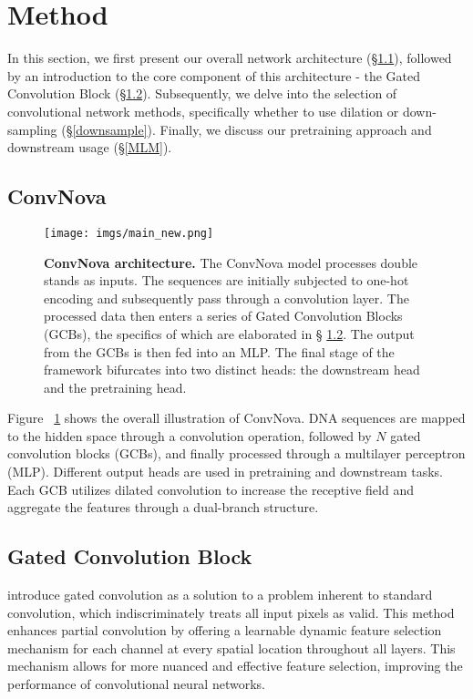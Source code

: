 \section{Method}
\label{Method}
In this section, we first present our overall network architecture (\S  \ref{dnacnn}), followed by an introduction to the core component of this architecture - the Gated Convolution Block (\S \ref{gatecnn}). Subsequently, we delve into the selection of convolutional network methods, specifically whether to use dilation or down-sampling (\S  \ref{downsample}). Finally, we discuss our pretraining approach and downstream usage (\S \ref{MLM}).

\subsection{ConvNova} \label{dnacnn}
\begin{figure}[!]
    \centering
    \texttt{[image: imgs/main\_new.png]} 
    \caption{\textbf{ConvNova architecture.} The ConvNova model processes double stands as inputs. The sequences are initially subjected to one-hot encoding and subsequently pass through a convolution layer. The processed data then enters a series of Gated Convolution Blocks (GCBs), the specifics of which are elaborated in %
    \S  
    \ref{gatecnn}. The output from the GCBs is then fed into an MLP. The final stage of the framework bifurcates into two distinct heads: the downstream head and the pretraining head.}\label{fig:dnacnn}
\end{figure}
Figure ~\ref{fig:dnacnn} shows the overall illustration of ConvNova. DNA sequences are mapped to the hidden space through a convolution operation, followed by $N$ gated convolution blocks (GCBs), and finally processed through a multilayer perceptron (MLP). Different output heads are used in pretraining and downstream tasks. Each GCB utilizes dilated convolution to increase the receptive field and aggregate the features through a dual-branch structure.

\subsection{Gated Convolution Block} \label{gatecnn}
\citet{yu2019free} introduce  gated convolution as a solution to a problem inherent to standard convolution, which indiscriminately treats all input pixels as valid. This method enhances partial convolution by offering a learnable dynamic feature selection mechanism for each channel at every spatial location throughout all layers. This mechanism allows for more nuanced and effective feature selection, improving the performance of convolutional neural networks.

